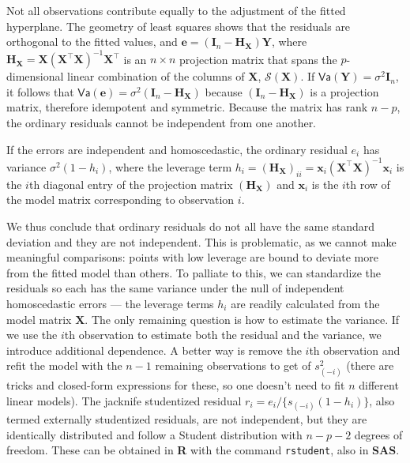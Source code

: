 \documentclass[
  11pt,
  letterpaper,
]{book}
\theoremstyle{definition}
\theoremstyle{definition}
\theoremstyle{definition}
\theoremstyle{remark}
\begin{document}
Not all observations contribute equally to the adjustment of the fitted hyperplane. The geometry of least squares shows that the residuals are orthogonal to the fitted values, and \(\boldsymbol{e} = (\mathbf{I}_n-\mathbf{H}_{\mathbf{X}})\boldsymbol{Y}\), where \(\mathbf{H}_{\mathbf{X}}=\mathbf{X}(\mathbf{X}^\top\mathbf{X})^{-1}\mathbf{X}^\top\) is an \(n \times n\) projection matrix that spans the \(p\)-dimensional linear combination of the columns of \(\mathbf{X}\), \(\mathcal{S}(\mathbf{X})\). If \(\mathsf{Va}(\boldsymbol{Y}) = \sigma^2\mathbf{I}_n\), it follows that \(\mathsf{Va}(\boldsymbol{e})=\sigma^2(\mathbf{I}_n-\mathbf{H}_{\mathbf{X}})\) because \((\mathbf{I}_n-\mathbf{H}_{\mathbf{X}})\) is a projection matrix, therefore idempotent and symmetric. Because the matrix has rank \(n-p\), the ordinary residuals cannot be independent from one another.

If the errors are independent and homoscedastic, the ordinary residual \(e_i\) has variance \(\sigma^2(1-h_{i})\), where the leverage term \(h_i =(\mathbf{H}_{\mathbf{X}})_{ii} = \mathbf{x}_i (\mathbf{X}^\top\mathbf{X})^{-1}\mathbf{x}_i\) is the \(i\)th diagonal entry of the projection matrix \((\mathbf{H}_{\mathbf{X}})\) and \(\mathbf{x}_i\) is the \(i\)th row of the model matrix corresponding to observation \(i\).

We thus conclude that ordinary residuals do not all have the same standard deviation and they are not independent. This is problematic, as we cannot make meaningful comparisons: points with low leverage are bound to deviate more from the fitted model than others. To palliate to this, we can standardize the residuals so each has the same variance under the null of independent homoscedastic errors --- the leverage terms \(h_i\) are readily calculated from the model matrix \(\mathbf{X}\).
The only remaining question is how to estimate the variance. If we use the \(i\)th observation to estimate both the residual and the variance, we introduce additional dependence. A better way is remove the \(i\)th observation and refit the model with the \(n-1\) remaining observations to get of \(s^2_{(-i)}\) (there are tricks and closed-form expressions for these, so one doesn't need to fit \(n\) different linear models). The jacknife studentized residual \(r_i = e_i/\{s_{(-i)}(1-h_i)\}\), also termed externally studentized residuals, are not independent, but they are identically distributed and follow a Student distribution with \(n-p-2\) degrees of freedom.
These can be obtained in \textbf{R} with the command \texttt{rstudent}, also in \textbf{SAS}.
\end{document}
